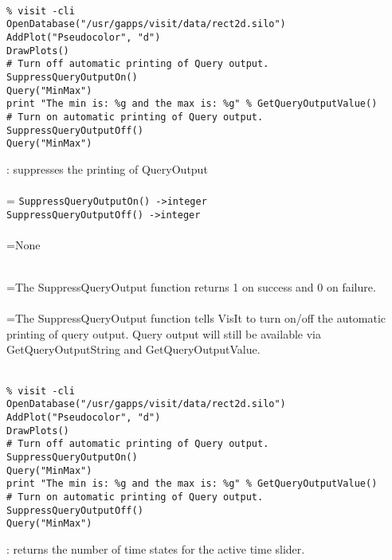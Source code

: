 \documentclass[10pt,a4paper]{report}
\begin{document}
\\[-6mm]
\begin{verbatim}% visit -cli
OpenDatabase("/usr/gapps/visit/data/rect2d.silo")
AddPlot("Pseudocolor", "d")
DrawPlots()
# Turn off automatic printing of Query output.
SuppressQueryOutputOn()
Query("MinMax")
print "The min is: %g and the max is: %g" % GetQueryOutputValue()
# Turn on automatic printing of Query output.
SuppressQueryOutputOff()
Query("MinMax")
\end{verbatim}
\newpage


{}
: suppresses the printing of QueryOutput\\[-3mm]

 \\ 
\hangindent=\parindent 
\verb!SuppressQueryOutputOn() ->integer!\\ 
\verb!SuppressQueryOutputOff() ->integer!\\ [-3mm]

 \\ 
\hangindent=\parindent None


 \\ 
\hangindent=\parindent The SuppressQueryOutput function returns 1 on success and 0 on failure. \\[-3mm] 

 \\ 
\hangindent=\parindent The SuppressQueryOutput function tells VisIt to turn on/off the automatic printing of query output.  Query output will still be available via  GetQueryOutputString and GetQueryOutputValue. \\[-3mm] 

\\[-6mm]
\begin{verbatim}% visit -cli
OpenDatabase("/usr/gapps/visit/data/rect2d.silo")
AddPlot("Pseudocolor", "d")
DrawPlots()
# Turn off automatic printing of Query output.
SuppressQueryOutputOn()
Query("MinMax")
print "The min is: %g and the max is: %g" % GetQueryOutputValue()
# Turn on automatic printing of Query output.
SuppressQueryOutputOff()
Query("MinMax")
\end{verbatim}
\newpage


{}
: returns the number of time states for the active time slider.\\[-3mm]
\end{document}
